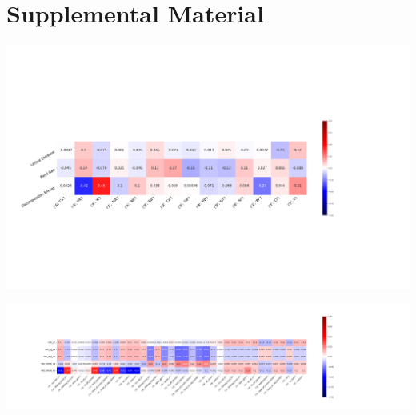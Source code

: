 \documentclass[twoside, twocolumn, 9pt, draft]{article}
\begin{document}
\section*{Supplemental Material}
\label{sec:org21a7cfd}
\begin{center}
\includegraphics[width=.9\linewidth]{HSE_v_comp_pearson2.png}
\end{center}
\begin{center}
\includegraphics[width=.9\linewidth]{HSE_v_site_prop_pearson.png}
\end{center}
\end{document}

